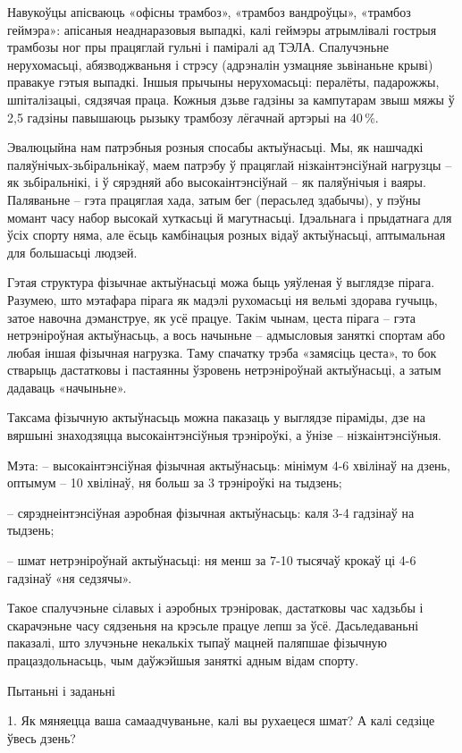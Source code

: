 Навукоўцы апісваюць «офісны трамбоз», «трамбоз вандроўцы», «трамбоз геймэра»: апісаныя неаднаразовыя выпадкі, калі геймэры атрымлівалі гострыя трамбозы ног пры працяглай гульні і паміралі ад ТЭЛА. Спалучэньне нерухомасьці, абязводжваньня і стрэсу (адрэналін узмацняе зьвінаньне крыві) правакуе гэтыя выпадкі. Іншыя прычыны нерухомасьці: пералёты, падарожжы, шпіталізацыі, сядзячая праца. Кожныя дзьве гадзіны за кампутарам звыш мяжы ў 2,5 гадзіны павышаюць рызыку трамбозу лёгачнай артэрыі на 40\,\%.

Эвалюцыйна нам патрэбныя розныя спосабы актыўнасьці. Мы, як нашчадкі паляўнічых-зьбіральнікаў, маем патрэбу ў працяглай нізкаінтэнсіўнай нагрузцы – як зьбіральнікі, і ў сярэдняй або высокаінтэнсіўнай – як паляўнічыя і ваяры. Паляваньне – гэта працяглая хада, затым бег (перасьлед здабычы), у пэўны момант часу набор высокай хуткасьці й магутнасьці. Ідэальнага і прыдатнага для ўсіх спорту няма, але ёсьць камбінацыя розных відаў актыўнасьці, аптымальная для большасьці людзей.

Гэтая структура фізычнае актыўнасьці можа быць уяўленая ў выглядзе пірага. Разумею, што мэтафара пірага як мадэлі рухомасьці ня вельмі здорава гучыць, затое навочна дэманструе, як усё працуе. Такім чынам, цеста пірага – гэта нетрэніроўная актыўнасьць, а вось начыньне – адмысловыя заняткі спортам або любая іншая фізычная нагрузка. Таму спачатку трэба «замясіць цеста», то бок стварыць дастатковы і пастаянны ўзровень нетрэніроўнай актыўнасьці, а затым дадаваць «начыньне».

Таксама фізычную актыўнасьць можна паказаць у выглядзе піраміды, дзе на вяршыні знаходзяцца высокаінтэнсіўныя трэніроўкі, а ўнізе – нізкаінтэнсіўныя.

Мэта:
– высокаінтэнсіўная фізычная актыўнасьць: мінімум 4-6 хвілінаў на дзень, оптымум – 10 хвілінаў, ня больш за 3 трэніроўкі на тыдзень; 

– сярэднеінтэнсіўная аэробная фізычная актыўнасьць: каля 3-4 гадзінаў на тыдзень;

– шмат нетрэніроўнай актыўнасьці: ня менш за 7-10 тысячаў крокаў ці 4-6 гадзінаў «ня седзячы».

Такое спалучэньне сілавых і аэробных трэніровак, дастатковы час хадзьбы і скарачэньне часу сядзеньня на крэсьле працуе лепш за ўсё. Дасьледаваньні паказалі, што злучэньне некалькіх тыпаў мацней паляпшае фізычную працаздольнасьць, чым даўжэйшыя заняткі адным відам спорту.

Пытаньні і заданьні

1. Як мяняецца ваша самаадчуваньне, калі вы рухаецеся шмат? А калі седзіце ўвесь дзень?

